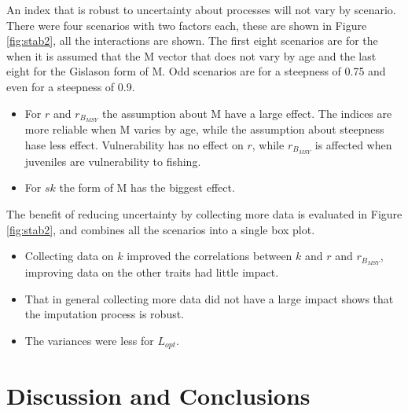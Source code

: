 \documentclass[12pt,doublespacing,a4paper]{ouparticle}
\begin{document}
An index that is robust to uncertainty about processes will not vary by scenario. There were four scenarios with two factors each, these are shown in Figure \ref{fig:stab2}, all the interactions are shown. The first eight scenarios are for the when it is assumed that the M vector that does not vary by age and the last eight for the Gislason form of M. Odd scenarios are for a steepness of 0.75 and even for a steepness of 0.9. 

\begin{itemize}
 \item For $r$ and $r_{B_{MSY}}$ the assumption about M have a large effect. The indices are more reliable when M varies by age, while the assumption about steepness hase less effect. Vulnerability has no effect on $r$, while $r_{B_{MSY}}$  is affected when juveniles are vulnerability to fishing. 
 \item For $sk$ the form of M has the biggest effect. 
\end{itemize}

The benefit of reducing uncertainty by collecting more data is evaluated in Figure \ref{fig:stab2}, and combines all the scenarios into a single box plot.

  \begin{itemize}
    \item Collecting data on $k$ improved the correlations between $k$ and $r$ and $r_{B_{MSY}}$, improving data on the other traits had little impact.  
    \item That in general collecting more data did not have a large impact shows that the imputation process is robust. 
    \item The variances were less for $L_{opt}$.
  \end{itemize}

\section{Discussion and Conclusions}
\end{document}
